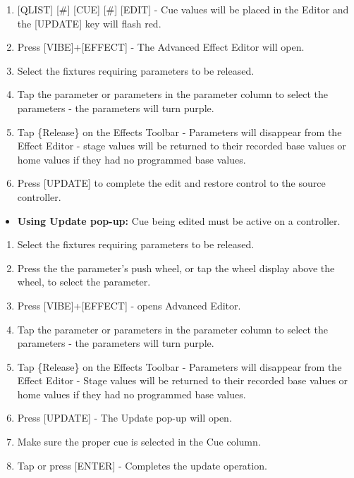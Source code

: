 \documentclass[
]{article}
\providecommand{\tightlist}{%
  \setlength{\itemsep}{0pt}\setlength{\parskip}{0pt}}
\begin{document}
\begin{enumerate}
\def\labelenumi{\arabic{enumi}.}
\item
  {[}QLIST{]} {[}\#{]} {[}CUE{]} {[}\#{]} {[}EDIT{]} - Cue values will be placed in the Editor and the {[}UPDATE{]} key will flash red.
\item
  Press {[}VIBE{]}+{[}EFFECT{]} - The Advanced Effect Editor will open.
\item
  Select the fixtures requiring parameters to be released.
\item
  Tap the parameter or parameters in the parameter column to select the parameters - the parameters will turn purple.
\item
  Tap \{Release\} on the Effects Toolbar - Parameters will disappear from the Effect Editor - stage values will be returned to their recorded base values or home values if they had no programmed base values.
\item
  Press {[}UPDATE{]} to complete the edit and restore control to the source controller.
\end{enumerate}

\begin{itemize}
\tightlist
\item
  \textbf{Using Update pop-up:} Cue being edited must be active on a controller.
\end{itemize}

\begin{enumerate}
\def\labelenumi{\arabic{enumi}.}
\item
  Select the fixtures requiring parameters to be released.
\item
  Press the the parameter's push wheel, or tap the wheel display above the wheel, to select the parameter.
\item
  Press {[}VIBE{]}+{[}EFFECT{]} - opens Advanced Editor.
\item
  Tap the parameter or parameters in the parameter column to select the parameters - the parameters will turn purple.
\item
  Tap \{Release\} on the Effects Toolbar - Parameters will disappear from the Effect Editor - Stage values will be returned to their recorded base values or home values if they had no programmed base values.
\item
  Press {[}UPDATE{]} - The Update pop-up will open.
\item
  Make sure the proper cue is selected in the Cue column.
\item
  Tap or press {[}ENTER{]} - Completes the update operation.
\end{enumerate}
\end{document}
